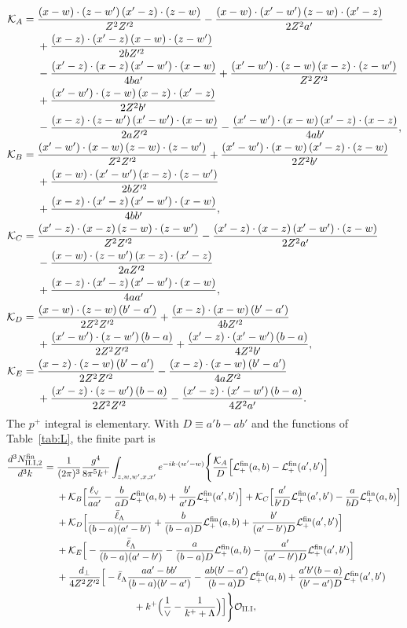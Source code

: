 \documentclass[aps,prd,onecolumn,superscriptaddress,nofootinbib,floatfix,longbibliography,11pt]{revtex4-2}
\numberwithin{equation}{section}
\newcommand{\KK}{\mathcal{K}}
\newcommand{\lV}{\ell_{\vee}}
\newcommand{\lLb}{\bar\ell_{\Lambda}}
\newcommand{\Lp}{\mathcal{L}_{+}}
\newcommand{\Ord}{\mathcal{O}}
\begin{document}
\begin{align}
\KK_A={}&\frac{(x-w)\cdot(z-w')\,(x'-z)\cdot(z-w)}{Z^2Z'^2}-\frac{(x-w)\cdot(x'-w')\,(z-w)\cdot(x'-z)}{2Z^2a'}\notag\\
&+\frac{(x-z)\cdot(x'-z)\,(x-w)\cdot(z-w')}{2bZ'^2}\notag\\
&-\frac{(x'-z)\cdot(x-z)\,(x'-w')\cdot(x-w)}{4ba'}+\frac{(x'-w')\cdot(z-w)\,(x-z)\cdot(z-w')}{Z^2Z'^2}\notag\\
&+\frac{(x'-w')\cdot(z-w)\,(x-z)\cdot(x'-z)}{2Z^2b'}\notag\\
&-\frac{(x-z)\cdot(z-w')\,(x'-w')\cdot(x-w)}{2aZ'^2}-\frac{(x'-w')\cdot(x-w)\,(x'-z)\cdot(x-z)}{4ab'},\notag\\
\KK_B={}&\frac{(x'-w')\cdot(x-w)\,(z-w)\cdot(z-w')}{Z^2Z'^2}+\frac{(x'-w')\cdot(x-w)\,(x'-z)\cdot(z-w)}{2Z^2b'}\notag\\
&+\frac{(x-w)\cdot(x'-w')\,(x-z)\cdot(z-w')}{2bZ'^2}\notag\\
&+\frac{(x-z)\cdot(x'-z)\,(x'-w')\cdot(x-w)}{4bb'},\notag\\
\KK_C={}&\frac{(x'-z)\cdot(x-z)\,(z-w)\cdot(z-w')}{Z^2Z'^2}-\frac{(x'-z)\cdot(x-z)\,(x'-w')\cdot(z-w)}{2Z^2a'}\notag\\
&-\frac{(x-w)\cdot(z-w')\,(x-z)\cdot(x'-z)}{2aZ'^2}\notag\\
&+\frac{(x-z)\cdot(x'-z)\,(x'-w')\cdot(x-w)}{4aa'},\notag\\
\KK_D={}&\frac{(x-w)\cdot(z-w)\,(b'-a')}{2Z^2Z'^2}+\frac{(x-z)\cdot(x-w)\,(b'-a')}{4bZ'^2}\notag\\
&+\frac{(x'-w')\cdot(z-w')\,(b-a)}{2Z^2Z'^2}+\frac{(x'-z)\cdot(x'-w')\,(b-a)}{4Z^2b'},\notag\\
\KK_E={}&\frac{(x-z)\cdot(z-w)\,(b'-a')}{2Z^2Z'^2}-\frac{(x-z)\cdot(x-w)\,(b'-a')}{4aZ'^2}\notag\\
&+\frac{(x'-z)\cdot(z-w')\,(b-a)}{2Z^2Z'^2}-\frac{(x'-z)\cdot(x'-w')\,(b-a)}{4Z^2a'}.
\label{eq:KAE}
\end{align}
The $p^+$ integral is elementary. With $D\equiv a'b-ab'$ and the functions of Table~\ref{tab:L}, the finite part is
\begin{align}
\frac{d^3N^{\rm fin}_{\rm II.I,2}}{d^3k}={}&\frac{1}{(2\pi)^3}\frac{g^4}{8\pi^5k^+}\int_{z,w,w',x,x'}e^{-ik\cdot(w'-w)}\Bigg\{\frac{\KK_A}{D}\Big[\Lp^{\rm fin}(a,b)-\Lp^{\rm fin}(a',b')\Big]\notag\\
&+\KK_B\Big[\frac{\lV}{aa'}-\frac{b}{aD}\Lp^{\rm fin}(a,b)+\frac{b'}{a'D}\Lp^{\rm fin}(a',b')\Big]+\KK_C\Big[\frac{a'}{b'D}\Lp^{\rm fin}(a',b')-\frac{a}{bD}\Lp^{\rm fin}(a,b)\Big]\notag\\
&+\KK_D\Big[\frac{\lLb}{(b-a)(a'-b')}+\frac{b}{(b-a)D}\Lp^{\rm fin}(a,b)+\frac{b'}{(a'-b')D}\Lp^{\rm fin}(a',b')\Big]\notag\\
&+\KK_E\Big[-\frac{\lLb}{(b-a)(a'-b')}-\frac{a}{(b-a)D}\Lp^{\rm fin}(a,b)-\frac{a'}{(a'-b')D}\Lp^{\rm fin}(a',b')\Big]\notag\\
&+\frac{d_\perp}{4Z^2Z'^2}\Big[-\lLb\frac{aa'-bb'}{(b-a)(b'-a')}-\frac{ab(b'-a')}{(b-a)D}\Lp^{\rm fin}(a,b)+\frac{a'b'(b-a)}{(b'-a')D}\Lp^{\rm fin}(a',b')\notag\\
&\hspace{8em}+k^+\Big(\frac1\vee-\frac{1}{k^++\Lambda}\Big)\Big]\Bigg\}\Ord_{\rm II.I},
\label{eq:finGIIpart2}
\end{align}
\end{document}
